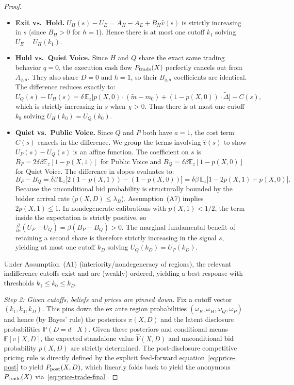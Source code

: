 \documentclass[11pt]{article}
\newcommand{\E}{\mathbb{E}}
\newcommand{\PP}{\mathbb{P}}
\newcommand{\1}{\mathbf{1}}
\begin{document}
\begin{proof}
\begin{itemize}[leftmargin=1.5em,itemsep=2pt]
\item \textbf{Exit vs.\ Hold.} $U_H(s)-U_E=A_{H}-A_{E}+B_{H}\hat v(s)$ is strictly increasing in $s$ (since $B_H>0$ for $h=1$). Hence there is at most one cutoff $k_1$ solving $U_E=U_H(k_1)$.
\item \textbf{Hold vs.\ Quiet Voice.} Since $H$ and $Q$ share the exact same trading behavior $q=0$, the execution cash flow $P_{\textup{trade}}(X)$ perfectly cancels out from $A_{q,a}$. They also share $D=0$ and $h=1$, so their $B_{q,a}$ coefficients are identical. The difference reduces exactly to:
\begin{equation}
U_Q(s)-U_H(s)=\delta\,\E_z\!\Big[p(X,0)\cdot(\tilde m-m_0)+(1-p(X,0))\cdot\tilde\Delta\Big]-C(s),
\label{eq:UH-UQ}
\end{equation}
which is strictly increasing in $s$ when $\chi>0$. Thus there is at most one cutoff $k_0$ solving $U_H(k_0)=U_Q(k_0)$.
\item \textbf{Quiet vs.\ Public Voice.} Since $Q$ and $P$ both have $a=1$, the cost term $C(s)$ cancels in the difference. We group the terms involving $\hat{v}(s)$ to show $U_P(s)-U_Q(s)$ is an affine function. The coefficient on $s$ is $B_P = 2\delta\beta\E_z[1-p(X,1)]$ for Public Voice and $B_Q = \delta\beta\E_z[1-p(X,0)]$ for Quiet Voice. The difference in slopes evaluates to:
\[
B_P - B_Q = \delta\beta \, \E_z\Big[ 2(1-p(X,1)) - (1-p(X,0)) \Big] = \delta\beta \, \E_z\Big[ 1 - 2p(X,1) + p(X,0) \Big].
\]
Because the unconditional bid probability is structurally bounded by the bidder arrival rate ($p(X,D) \le \lambda_B$), Assumption~\textup{(A7)} implies $2p(X,1)\le 1$. In nondegenerate calibrations with $p(X,1)<1/2$, the term inside the expectation is strictly positive, so $\frac{\partial}{\partial s}(U_P - U_Q)=\beta(B_P-B_Q)>0$. The marginal fundamental benefit of retaining a second share is therefore strictly increasing in the signal $s$, yielding at most one cutoff $k_D$ solving $U_Q(k_D)=U_P(k_D)$.
\end{itemize}
Under Assumption~\textup{(A1)} (interiority/nondegeneracy of regions), the relevant indifference cutoffs exist and are (weakly) ordered, yielding a best response with thresholds $k_1\le k_0\le k_D$.

\textit{Step 2: Given cutoffs, beliefs and prices are pinned down.}
Fix a cutoff vector $(k_1,k_0,k_D)$. This pins down the ex ante region probabilities $(\omega_E,\omega_H,\omega_Q,\omega_P)$ and hence (by Bayes' rule) the posteriors $\pi(X,D)$ and the latent disclosure probabilities $\PP(D=d \mid X)$. Given these posteriors and conditional means $\E[v \mid X,D]$, the expected standalone value $\hat{V}(X,D)$ and unconditional bid probability $p(X,D)$ are strictly determined. The post-disclosure competitive pricing rule is directly defined by the explicit feed-forward equation~\eqref{eq:price-post} to yield $P_{\textup{post}}(X,D)$, which linearly folds back to yield the anonymous $P_{\textup{trade}}(X)$ via~\eqref{eq:price-trade-final}.


\end{proof}
\end{document}
